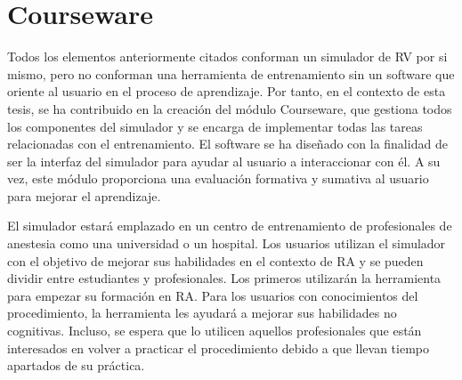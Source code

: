 \section{Courseware}
\label{rasim:courseware}
Todos los elementos anteriormente citados conforman un simulador de \ac{RV} por si mismo, pero no conforman una herramienta de entrenamiento sin un software que oriente al usuario en el proceso de aprendizaje. Por tanto, en el contexto de esta tesis, se ha contribuido en la creación del módulo \ac{Courseware}, que gestiona todos los componentes del simulador y se encarga de implementar todas las tareas relacionadas con el entrenamiento. El software se ha diseñado con la finalidad de ser la interfaz del simulador para ayudar al usuario a interaccionar con él. A su vez, este módulo proporciona una evaluación formativa y sumativa al usuario para mejorar el aprendizaje.





El simulador estará emplazado en un centro de entrenamiento de profesionales de anestesia como una universidad o un hospital. Los usuarios utilizan el simulador con el objetivo de mejorar sus habilidades en el contexto de \ac{RA} y se pueden dividir entre estudiantes y profesionales. Los primeros utilizarán la herramienta para empezar su formación en \ac{RA}. Para los usuarios con conocimientos del procedimiento, la herramienta les ayudará a mejorar sus habilidades no cognitivas. Incluso, se espera que lo utilicen aquellos profesionales que están interesados en volver a practicar el procedimiento debido a que llevan tiempo apartados de su práctica.


